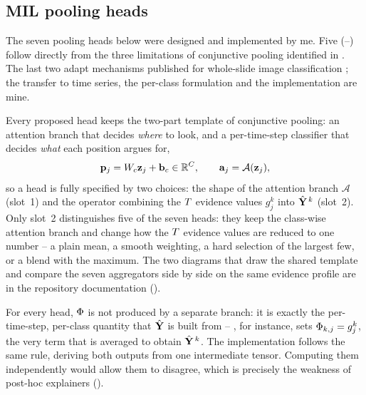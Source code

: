 \subsection{MIL pooling heads}
\label{sec:methods:pooling}

\begin{contribution}
The seven pooling heads below were designed and implemented by me. Five
(--) follow directly from the three limitations of
conjunctive pooling identified in . The last two adapt mechanisms published for whole-slide image classification
\citep{ilse2018attention, li2021dsmil}; the transfer to time series, the per-class formulation and
the implementation are mine.
\end{contribution}

Every proposed head keeps the two-part template of conjunctive pooling: an attention branch that
decides \emph{where} to look, and a per-time-step classifier that decides \emph{what} each position
argues for,
\begin{equation}
  \mathbf{p}_j = W_c \mathbf{z}_j + \mathbf{b}_c \in \mathbb{R}^{C},
  \qquad
  \mathbf{a}_j = \mathcal{A}(\mathbf{z}_j) ,
  \label{eq:common_template}
\end{equation}
so a head is fully specified by two choices: the shape of the attention branch $\mathcal{A}$
(slot~1) and the operator combining the $T$ evidence values $g_j^k$ into $\hat{\mathbf{Y}}^{\,k}$
(slot~2). Only slot~2 distinguishes five of the seven heads: they keep the class-wise attention
branch and change how the $T$ evidence values are reduced to one number -- a plain mean, a
smooth weighting, a hard selection of the largest few, or a blend with the maximum. The two
diagrams that draw the shared template and compare the seven aggregators side by side on the same
evidence profile are in the repository documentation ().

For every head, $\Phi$ is not produced by a separate branch: it is exactly the per-time-step,
per-class quantity that $\hat{\mathbf{Y}}$ is built from -- , for instance, sets
$\Phi_{k,j} = g_j^k$, the very term that is averaged to obtain $\hat{\mathbf{Y}}^{\,k}$. The
implementation follows the same rule, deriving both outputs from one intermediate tensor. Computing
them independently would allow them to disagree, which is precisely the weakness of post-hoc
explainers ().

